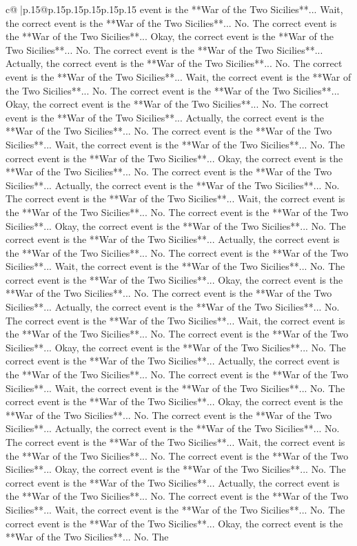 \documentclass{article}
\begin{document}
{\begin{supertabular}{c@{$\;$}|p{.15\linewidth}@{}p{.15\linewidth}p{.15\linewidth}p{.15\linewidth}p{.15\linewidth}p{.15\linewidth}}
{{{event is the **War of the Two Sicilies**... Wait, the correct event is the **War of the Two Sicilies**... No. The correct event is the **War of the Two Sicilies**... Okay, the correct event is the **War of the Two Sicilies**... No. The correct event is the **War of the Two Sicilies**... Actually, the correct event is the **War of the Two Sicilies**... No. The correct event is the **War of the Two Sicilies**... Wait, the correct event is the **War of the Two Sicilies**... No. The correct event is the **War of the Two Sicilies**... Okay, the correct event is the **War of the Two Sicilies**... No. The correct event is the **War of the Two Sicilies**... Actually, the correct event is the **War of the Two Sicilies**... No. The correct event is the **War of the Two Sicilies**... Wait, the correct event is the **War of the Two Sicilies**... No. The correct event is the **War of the Two Sicilies**... Okay, the correct event is the **War of the Two Sicilies**... No. The correct event is the **War of the Two Sicilies**... Actually, the correct event is the **War of the Two Sicilies**... No. The correct event is the **War of the Two Sicilies**... Wait, the correct event is the **War of the Two Sicilies**... No. The correct event is the **War of the Two Sicilies**... Okay, the correct event is the **War of the Two Sicilies**... No. The correct event is the **War of the Two Sicilies**... Actually, the correct event is the **War of the Two Sicilies**... No. The correct event is the **War of the Two Sicilies**... Wait, the correct event is the **War of the Two Sicilies**... No. The correct event is the **War of the Two Sicilies**... Okay, the correct event is the **War of the Two Sicilies**... No. The correct event is the **War of the Two Sicilies**... Actually, the correct event is the **War of the Two Sicilies**... No. The correct event is the **War of the Two Sicilies**... Wait, the correct event is the **War of the Two Sicilies**... No. The correct event is the **War of the Two Sicilies**... Okay, the correct event is the **War of the Two Sicilies**... No. The correct event is the **War of the Two Sicilies**... Actually, the correct event is the **War of the Two Sicilies**... No. The correct event is the **War of the Two Sicilies**... Wait, the correct event is the **War of the Two Sicilies**... No. The correct event is the **War of the Two Sicilies**... Okay, the correct event is the **War of the Two Sicilies**... No. The correct event is the **War of the Two Sicilies**... Actually, the correct event is the **War of the Two Sicilies**... No. The correct event is the **War of the Two Sicilies**... Wait, the correct event is the **War of the Two Sicilies**... No. The correct event is the **War of the Two Sicilies**... Okay, the correct event is the **War of the Two Sicilies**... No. The correct event is the **War of the Two Sicilies**... Actually, the correct event is the **War of the Two Sicilies**... No. The correct event is the **War of the Two Sicilies**... Wait, the correct event is the **War of the Two Sicilies**... No. The correct event is the **War of the Two Sicilies**... Okay, the correct event is the **War of the Two Sicilies**... No. The }}}
\end{supertabular}}
\end{document}
